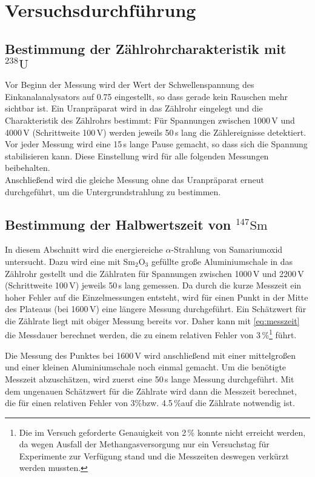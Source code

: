 \section{Versuchsdurchführung}

\subsection{Bestimmung der Zählrohrcharakteristik mit \texorpdfstring{${}^{238}\text{U}$}{U-238}}
Vor Beginn der Messung wird der Wert der Schwellenspannung des
Einkanalanalysators auf 0.75 eingestellt, so dass gerade kein Rauschen mehr
sichtbar ist. Ein Uranpräparat wird in das Zählrohr eingelegt und die
Charakteristik des Zählrohrs bestimmt: Für Spannungen zwischen 1000\,V und
4000\,V (Schrittweite 100\,V) werden jeweils 50\,s lang die Zählereignisse
detektiert. Vor jeder Messung wird eine 15\,s lange Pause gemacht, so dass sich
die Spannung stabilisieren kann. Diese Einstellung wird für alle folgenden
Messungen beibehalten.\\
Anschließend wird die gleiche Messung ohne das Uranpräparat erneut durchgeführt,
um die Untergrundstrahlung zu bestimmen.

\subsection{Bestimmung der Halbwertszeit von \texorpdfstring{${}^{147}\text{Sm}$}{Sm-147}}
In diesem Abschnitt wird die energiereiche $\alpha$-Strahlung von Samariumoxid
untersucht. Dazu wird eine mit Sm$_2$O$_3$ gefüllte große Aluminiumschale in das Zählrohr
gestellt und die Zählraten für Spannungen zwischen 1000\,V und 2200\,V
(Schrittweite 100\,V) jeweils 50\,s lang gemessen.
Da durch die kurze Messzeit ein hoher Fehler auf die Einzelmessungen entsteht,
wird für einen Punkt in der Mitte des Plateaus (bei 1600\,V) eine längere Messung durchgeführt.
Ein Schätzwert für die Zählrate liegt mit obiger Messung bereits vor. Daher kann mit 
\autoref{eq:messzeit} die Messdauer berechnet werden, die zu einem relativen Fehler von
3\,\%\footnote{Die im Versuch geforderte Genauigkeit von 2\,\% konnte nicht
erreicht werden, da wegen Ausfall der Methangasversorgung nur ein Versuchstag
für Experimente zur Verfügung stand und die Messzeiten deswegen verkürzt werden
mussten.}
führt.


Die Messung des Punktes bei 1600\,V wird anschließend mit einer mittelgroßen
und einer kleinen Aluminiumschale noch einmal gemacht.
Um die benötigte Messzeit abzuschätzen, wird zuerst eine
50\,s lange Messung durchgeführt. Mit dem ungenauen Schätzwert für die Zählrate
wird dann die Messzeit berechnet,
die für einen relativen Fehler von 3\%\footnotemark[1] bzw. 4.5\,\%\footnotemark[1]
auf die Zählrate notwendig ist.

